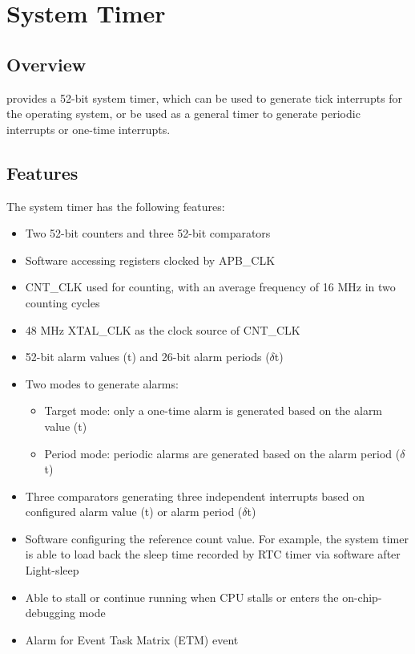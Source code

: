 \documentclass[main\_\_EN.tex]{subfiles}
\begin{document}

\ifglobal
\else
    \listoftodos
    {\let\clearpage\relax \listofdonetodos}
    \tableofcontents
\fi



\hypertarget{systimer}{}
\chapter{System Timer}
\label{mod:systimer}

\section{Overview}

\chipname{} provides a 52-bit system timer, which can be used to generate tick interrupts for the operating system, or be used as a general timer to generate periodic interrupts or one-time interrupts.


\section{Features}

The system timer has the following features:

\begin{itemize}
    \item Two 52-bit counters and three 52-bit comparators
    \item Software accessing registers clocked by APB\_CLK
    \item CNT\_CLK used for counting, with an average frequency of 16 MHz in two counting cycles
    \item 48 MHz XTAL\_CLK as the clock source of CNT\_CLK
    \item 52-bit alarm values (t) and 26-bit alarm periods ($\delta$t)
    \item Two modes to generate alarms:
    \begin{itemize}
        \item Target mode: only a one-time alarm is generated based on the alarm value (t)
        \item Period mode: periodic alarms are generated based on the alarm period ($\delta$t)
    \end{itemize}
    \item Three comparators generating three independent interrupts based on configured alarm value (t) or alarm period ($\delta$t)
    \item Software configuring the reference count value. For example, the system timer is able to load back the sleep time recorded by RTC timer via software after Light-sleep
    \item Able to stall or continue running when CPU stalls or enters the on-chip-debugging mode
    \item Alarm for Event Task Matrix (ETM) event
\end{itemize}
\end{document}
